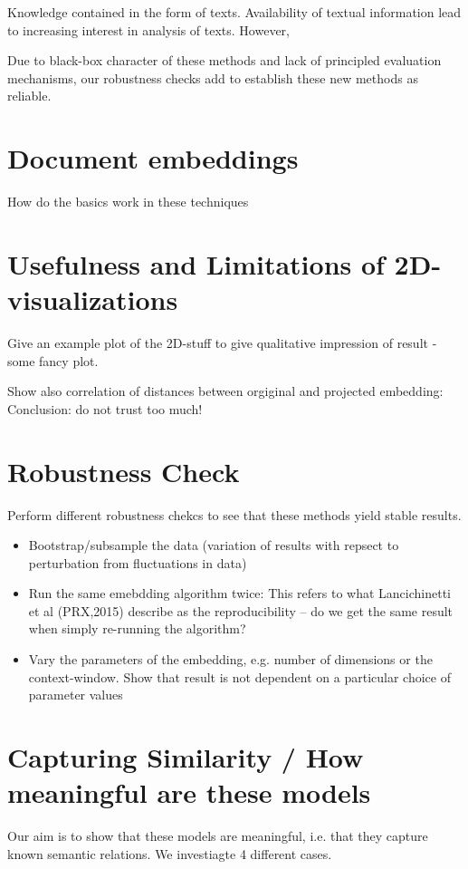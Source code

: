 \documentclass[aps,pre,twocolumn,superscriptaddress]{revtex4-1}
\begin{document}
Knowledge contained in the form of texts.
Availability of textual information lead to increasing interest in analysis of texts.
However, 

Due to black-box character of these methods and lack of principled evaluation mechanisms, our robustness checks add to establish these new methods as reliable.



\section{Document embeddings}
%
How do the basics work in these techniques

\section{Usefulness and Limitations of 2D-visualizations}
%
Give an example plot of the 2D-stuff to give qualitative impression of result - some fancy plot.

Show also correlation of distances between orgiginal and projected embedding:
Conclusion: do not trust too much!

\section{Robustness Check}
%
Perform different robustness chekcs to see that these methods yield stable results.
\begin{itemize}
 \item Bootstrap/subsample the data (variation of results with repsect to perturbation from fluctuations in data)
 \item Run the same emebdding algorithm twice: This refers to what Lancichinetti et al (PRX,2015) describe as the reproducibility -- do we get the same result when simply re-running the algorithm?
 \item Vary the parameters of the embedding, e.g. number of dimensions or the context-window. Show that result is not dependent on a particular choice of parameter values
\end{itemize}


\section{Capturing Similarity / How meaningful are these models}
%
Our aim is to show that these models are meaningful, i.e. that they capture known semantic relations.
We investiagte 4 different cases.
\end{document}
